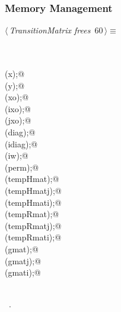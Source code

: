 \documentclass{article}
\begin{document}
\subsubsection{Memory Management}

\begin{flushleft} \small
\begin{minipage}{\linewidth}\label{scrap89}\raggedright\small
{} $\langle\,${\itshape TransitionMatrix frees}\nobreak\ {\footnotesize {60}}$\,\rangle\equiv$
\vspace{-1ex}
\begin{list}{}{} \item
\mbox{}\verb@@\\
\mbox{}\verb@@\\
\mbox{}\verb@free(x);@\\
\mbox{}\verb@free(y);@\\
\mbox{}\verb@free(xo);@\\
\mbox{}\verb@free(ixo);@\\
\mbox{}\verb@free(jxo);@\\
\mbox{}\verb@free(diag);@\\
\mbox{}\verb@free(idiag);@\\
\mbox{}\verb@free(iw);@\\
\mbox{}\verb@free(perm);@\\
\mbox{}\verb@free(tempHmat);@\\
\mbox{}\verb@free(tempHmatj);@\\
\mbox{}\verb@free(tempHmati);@\\
\mbox{}\verb@free(tempRmat);@\\
\mbox{}\verb@free(tempRmatj);@\\
\mbox{}\verb@free(tempRmati);@\\
\mbox{}\verb@free(gmat);@\\
\mbox{}\verb@free(gmatj);@\\
\mbox{}\verb@free(gmati);@\\
\mbox{}\verb@@\\
\mbox{}\verb@@{\NWsep}
\end{list}
\vspace{-1.5ex}
\footnotesize
\begin{list}{}{\setlength{\itemsep}{-\parsep}\setlength{\itemindent}{-\leftmargin}}
\item \NWtxtMacroRefIn\ .

\end{list}
\end{minipage}
\end{flushleft}
\end{document}
